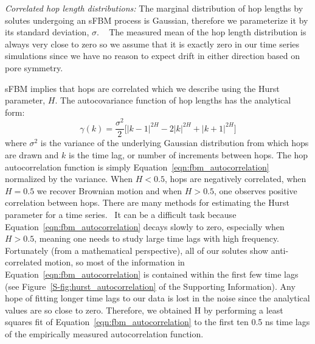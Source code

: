 \documentclass[aps,pre,preprint,groupedaddress]{revtex4-2}
\begin{document}
  \textit{Correlated hop length distributions:} The marginal distribution of hop 
  lengths by solutes undergoing an sFBM process is Gaussian, therefore we 
  parameterize it by its standard deviation, $\sigma$.
  ~\cite{metzler_random_2000, metzler_anomalous_2014,neusius_subdiffusion_2009}
  The measured mean of the hop length distribution is always very close to zero so
  we assume that it is exactly zero in our time series simulations since we have 
  no reason to expect drift in either direction based on pore symmetry.

  sFBM implies that hops are correlated which we describe using the Hurst parameter, $H$. 
  The autocovariance function of hop lengths has the analytical form:~\cite{mandelbrot_fractional_1968}
  \begin{equation}
    \gamma(k) = \dfrac{\sigma^2}{2}\bigg[|k-1|^{2H} - 2|k|^{2H} + |k+1|^{2H}\bigg]
  \label{eqn:fbm_autocorrelation}
  \end{equation}
  where $\sigma^2$ is the variance of the underlying Gaussian distribution from which hops are
  drawn and $k$ is the time lag, or number of increments between hops. The hop autocorrelation
  function is simply Equation~\ref{eqn:fbm_autocorrelation} normalized by the variance. 
  When $H < 0.5$, hops are negatively correlated, when $H = 0.5$ we recover Brownian motion
  and when $H > 0.5$, one observes positive correlation between hops. 
  There are many methods
  for estimating the Hurst parameter for a time series.~\cite{clegg_practical_2006} It can
  be a difficult task because Equation~\ref{eqn:fbm_autocorrelation} decays slowly to zero, 
  especially when $H > 0.5$, meaning one needs to study large time lags with high frequency.
  Fortunately (from a mathematical perspective), all of our solutes show anti-correlated motion, so most of the information in
  Equation~\ref{eqn:fbm_autocorrelation} is contained within the first few time lags (see 
  Figure~\ref{S-fig:hurst_autocorrelation} of the Supporting Information). Any hope of
  fitting longer time lags to our data is lost in the noise since the analytical values
  are so close to zero. Therefore, we obtained H by performing a least squares fit of 
  Equation~\ref{eqn:fbm_autocorrelation} to the first 
  ten  
  0.5 ns time lags of the 
  empirically measured autocorrelation function.
\end{document}

